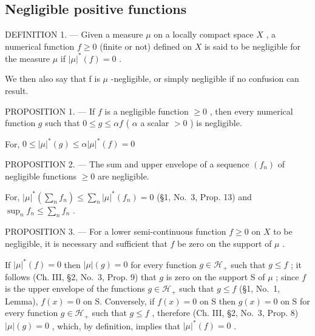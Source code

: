 \subsection{Negligible positive functions}

DEFINITION 1. --- Given a measure \(\mu\) on a locally compact space \(X\) , a numerical function \(f \geqslant 0\) (finite or not) defined on \(X\) is said to be negligible for the measure \(\mu\) if \(|\mu|^*(f) = 0\) .

We then also say that f is \(\mu\) -negligible, or simply negligible if no confusion can result.

PROPOSITION 1. --- If \(f\) is a negligible function \(\geqslant 0\) , then every numerical function \(g\) such that \(0 \leqslant g \leqslant \alpha f\) ( \(\alpha\) a scalar \(> 0\) ) is negligible.

For, \(0 \leqslant |\mu|^*(g) \leqslant \alpha |\mu|^*(f) = 0\)

PROPOSITION 2. --- The sum and upper envelope of a sequence \((f_{n})\) of negligible functions \(\geqslant0\) are negligible.

For, \(|\mu|^*(\sum_n f_n) \leqslant \sum_n |\mu|^*(f_n) = 0\) (§1, No.~3, Prop. 13) and \(\sup_n f_n \leqslant \sum_n f_n\) .

PROPOSITION 3. --- For a lower semi-continuous function \(f \geqslant 0\) on \(X\) to be negligible, it is necessary and sufficient that \(f\) be zero on the support of \(\mu\) .

If \(|\mu|^*(f) = 0\) then \(|\mu|(g) = 0\) for every function \(g \in \mathcal{H}_+\) such that \(g \leqslant f\) ; it follows (Ch. III, §2, No.~3, Prop. 9) that \(g\) is zero on the support S of \(\mu\) ; since \(f\) is the upper envelope of the functions \(g \in \mathcal{H}_+\) such that \(g \leqslant f\) (§1, No.~1, Lemma), \(f(x) = 0\) on S. Conversely, if \(f(x) = 0\) on S then \(g(x) = 0\) on S for every function \(g \in \mathcal{H}_+\) such that \(g \leqslant f\) , therefore (Ch. III, §2, No.~3, Prop. 8) \(|\mu|(g) = 0\) , which, by definition, implies that \(|\mu|^*(f) = 0\) .

